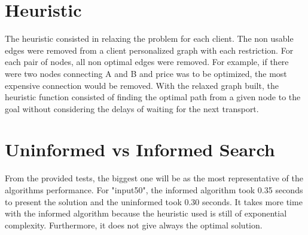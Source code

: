 \documentclass[a4paper]{article}
\begin{document}
    \section{Heuristic}
    The heuristic consisted in relaxing the problem for each client. The non usable edges were removed from a client personalized graph with each restriction. For each pair of nodes, all non optimal edges were removed. For example, if there were two nodes connecting A and B and price was to be optimized, the most expensive connection would be removed.
    With the relaxed graph built, the heuristic function consisted of finding the optimal path from a given node to the goal without considering the delays of waiting for the next transport.
    
    \section{Uninformed vs Informed Search}
    From the provided tests, the biggest one will be as the most representative of the algorithms performance.
    For "input50", the informed algorithm took 0.35 seconds to present the solution and the uninformed took 0.30 seconds. It takes more time with the informed algorithm because the heuristic used is still of exponential complexity. Furthermore, it does not give always the optimal solution.

    
    
























	
\end{document}
